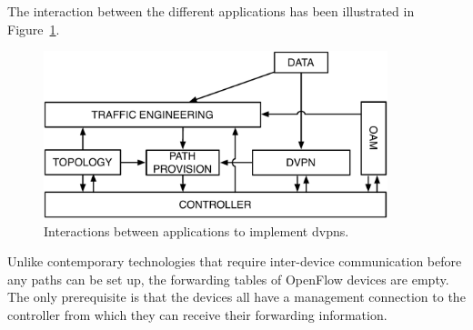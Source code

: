 The interaction between the different applications has been illustrated in Figure~\ref{fig:dvpn-apps}.

\begin{figure}[h]
	\centering
	\includegraphics[width=10cm]{./includes/dvpn-apps.pdf}
	\caption{Interactions between applications to implement \acp{dvpn}.}
	\label{fig:dvpn-apps}
\end{figure}

Unlike contemporary technologies that require inter-device communication before any paths can be set up, the forwarding tables of OpenFlow devices are empty. The only prerequisite is that the devices all have a management connection to the controller from which they can receive their forwarding information.




